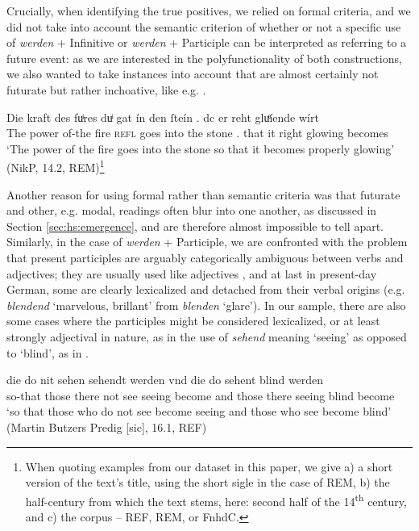 \documentclass[output=paper,colorlinks,citecolor=brown]{langscibook}
\begin{document}
Crucially, when identifying the true positives, we relied on formal criteria, and we did not take into account the semantic criterion of whether or not a specific use of \textit{werden} + Infinitive or \textit{werden} + Participle can be interpreted as referring to a future event: as we are interested in the polyfunctionality of both constructions, we also wanted to take instances into account that are almost certainly not futurate but rather inchoative, like e.g. .

\ea \label{ex:hs:gluehende}
\gll Die kraft des fuͥres duͥ gat ín den ſteín . dc er reht gluͤíende wírt \\
The power of-the fire \textsc{refl} goes into the stone . that it right glowing becomes \\
\glt `The power of the fire goes into the stone so that it becomes properly glowing' (NikP, 14.2, REM)\footnote{When quoting examples from our dataset in this paper, we give a) a short version of the text's title, using the short sigle in the case of REM, b) the half-century from which the text stems, here: second half of the 14\textsuperscript{th} century, and c) the corpus -- REF, REM, or FnhdC.} 
\z

Another reason for using formal rather than semantic criteria was that futurate and other, e.g. modal, readings often blur into one another, as discussed in Section \ref{sec:hs:emergence}, and are therefore almost impossible to tell apart. Similarly, in the case of \textit{werden} + Participle, we are confronted with the problem that present participles are arguably categorically ambiguous between verbs and adjectives; they are usually used like adjectives \citep[209]{eisenbergGrundrissDeutschenGrammatik2020}, and at last in present-day German, some are clearly lexicalized and detached from their verbal origins (e.g. \textit{blendend} `marvelous, brillant' from \textit{blenden} `glare'). In our sample, there are also some cases where the participles might be considered lexicalized, or at least strongly adjectival in nature, as in the use of \textit{sehend} meaning `seeing' as opposed to `blind', as in . 

\ea \label{ex:hs:sehendt}
 die do nit sehen sehendt werden vnd die do sehent blind werden \\
so-that those there not see seeing become and those there seeing blind become \\
\glt `so that those who do not see become seeing and those who see become blind' (Martin Butzers Predig [sic], 16.1, REF)
\z
\end{document}

